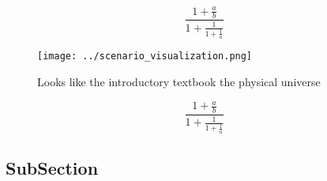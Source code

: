 \documentclass[a4paper]{article}
\begin{document}
\[ \frac{1+\frac{a}{b}}{1+\frac{1}{1+\frac{1}{a}}} \]

\begin{figure}
\centering
\texttt{[image: ../scenario\_visualization.png]}
\caption{Looks like the introductory textbook the physical universe 
}
\end{figure}
 
\[ \frac{1+\frac{a}{b}}{1+\frac{1}{1+\frac{1}{a}}} \]

\subsection{SubSection}
\end{document}
